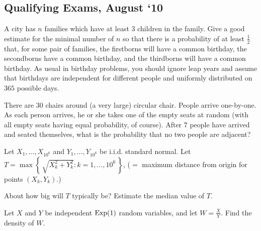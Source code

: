 \subsection{Qualifying Exams, August `10}
\begin{problem}
  A city has \(n\) families which have at least \(3\) children in the
  family. Give a good estimate for the minimal number of \(n\) so that
  there is a probability of at least \(\frac{1}{2}\) that, for some pair of
  families, the firstborns will have a common birthday, the secondborns
  have a common birthday, and the thirdborns will have a common
  birthday. As usual in birthday problems, you should ignore leap years and
  assume that birthdays are independent for different people and uniformly
  distributed on \(365\) possible days.
\end{problem}
\begin{solution*}
\end{solution*}

\begin{problem}
  There are \(30\) chairs around (a very large) circular chair. People
  arrive one-by-one. As each person arrives, he or she takes one of the
  empty seats at random (with all empty seats having equal probability, of
  course). After \(7\) people have arrived and seated themselves, what is
  the probability that no two people are adjacent?
\end{problem}
\begin{solution*}
\end{solution*}

\begin{problem}
  Let \(X_1,\dotsc,X_{10^6}\) and \(Y_1,\dotsc,Y_{10^6}\) be i.i.d.\@
  standard normal. Let
  \(T=\max\left\{\,\sqrt{X_k^2+Y_k^2}:k=1,\dotsc,10^6\,\right\}\), (\(=\)
  maximum distance from origin for points \((X_k,Y_k)\).)

  \noindent About how big will \(T\) typically be? Estimate the median
  value of \(T\).
\end{problem}
\begin{solution*}
\end{solution*}

\begin{problem}
  Let \(X\) and \(Y\) be independent \(\operatorname{Exp}(1)\) random variables, and let
  \(W=\frac{X}{Y}\). Find the density of \(W\).
\end{problem}
\begin{solution*}
\end{solution*}

